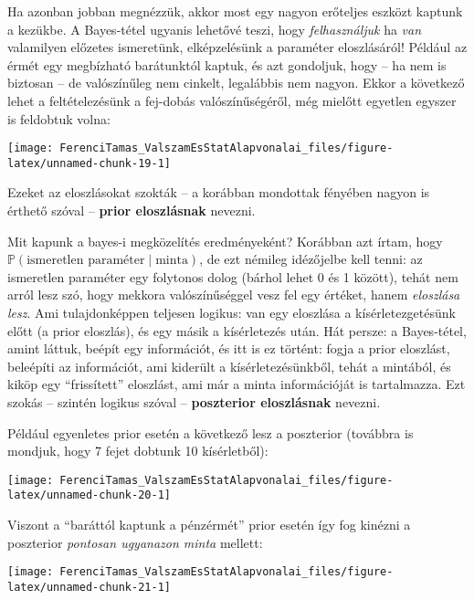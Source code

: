 \documentclass[magyar,]{book}
\begin{document}
Ha azonban jobban megnézzük, akkor most egy nagyon erőteljes eszközt kaptunk a kezükbe. A Bayes-tétel ugyanis lehetővé teszi, hogy \emph{felhasználjuk} ha \emph{van} valamilyen előzetes ismeretünk, elképzelésünk a paraméter eloszlásáról! Például az érmét egy megbízható barátunktól kaptuk, és azt gondoljuk, hogy -- ha nem is biztosan -- de valószínűleg nem cinkelt, legalábbis nem nagyon. Ekkor a következő lehet a feltételezésünk a fej-dobás valószínűségéről, még mielőtt egyetlen egyszer is feldobtuk volna:

\begin{center}\texttt{[image: FerenciTamas\_ValszamEsStatAlapvonalai\_files/figure-latex/unnamed-chunk-19-1]} \end{center}

Ezeket az eloszlásokat szokták -- a korábban mondottak fényében nagyon is érthető szóval -- \textbf{prior eloszlásnak} nevezni.

Mit kapunk a bayes-i megközelítés eredményeként? Korábban azt írtam, hogy \(\mathbb{P}\left(\text{ismeretlen paraméter}\mid\text{minta}\right)\), de ezt némileg idézőjelbe kell tenni: az ismeretlen paraméter egy folytonos dolog (bárhol lehet 0 és 1 között), tehát nem arról lesz szó, hogy mekkora valószínűséggel vesz fel egy értéket, hanem \emph{eloszlása lesz}. Ami tulajdonképpen teljesen logikus: van egy eloszlása a kísérletezgetésünk előtt (a prior eloszlás), és egy másik a kísérletezés után. Hát persze: a Bayes-tétel, amint láttuk, beépít egy információt, és itt is ez történt: fogja a prior eloszlást, beleépíti az információt, ami kiderült a kísérletezésünkből, tehát a mintából, és kiköp egy \enquote{frissített} eloszlást, ami már a minta információját is tartalmazza. Ezt szokás -- szintén logikus szóval -- \textbf{poszterior eloszlásnak} nevezni.

Például egyenletes prior esetén a következő lesz a poszterior (továbbra is mondjuk, hogy 7 fejet dobtunk 10 kísérletből):

\begin{center}\texttt{[image: FerenciTamas\_ValszamEsStatAlapvonalai\_files/figure-latex/unnamed-chunk-20-1]} \end{center}

Viszont a \enquote{baráttól kaptunk a pénzérmét} prior esetén így fog kinézni a poszterior \emph{pontosan ugyanazon minta} mellett:

\begin{center}\texttt{[image: FerenciTamas\_ValszamEsStatAlapvonalai\_files/figure-latex/unnamed-chunk-21-1]} \end{center}
\end{document}
